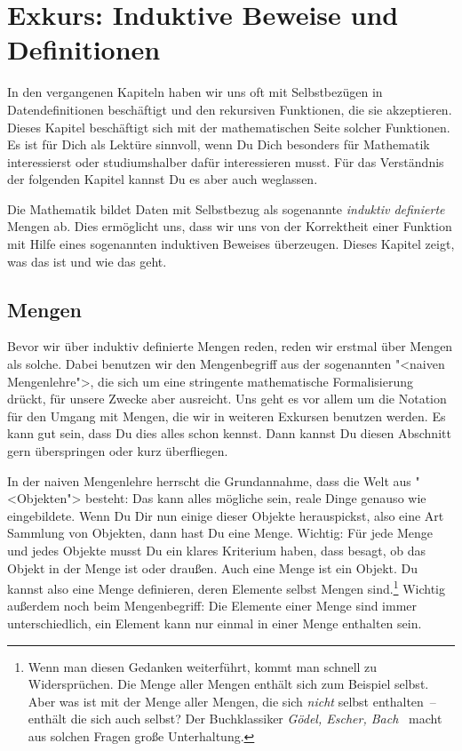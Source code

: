 
\chapter{Exkurs: Induktive Beweise und Definitionen}
\label{cha:indu}

In den vergangenen Kapiteln haben wir uns oft mit Selbstbezügen in
Datendefinitionen beschäftigt und den rekursiven Funktionen, die sie
akzeptieren.  Dieses Kapitel beschäftigt sich mit der mathematischen
Seite solcher Funktionen.  Es ist für Dich als Lektüre sinnvoll, wenn
Du Dich besonders für Mathematik interessierst oder studiumshalber
dafür interessieren musst.  Für das Verständnis der folgenden Kapitel
kannst Du es aber auch weglassen.

Die Mathematik bildet Daten mit Selbstbezug als sogenannte
\textit{induktiv definierte} Mengen ab.  Dies ermöglicht uns, dass wir
uns von der Korrektheit einer Funktion mit Hilfe eines sogenannten
induktiven Beweises überzeugen.  Dieses Kapitel zeigt, was das ist und
wie das geht.

\section{Mengen}
\label{sec:mengen}

Bevor wir über induktiv definierte Mengen reden, reden wir erstmal
über Mengen als solche.  Dabei benutzen wir den
Mengenbegriff aus der sogenannten "<naiven Mengenlehre">, die sich um
eine stringente mathematische Formalisierung drückt, für unsere Zwecke
aber ausreicht.  Uns geht es vor allem um die Notation für den Umgang
mit Mengen, die wir in weiteren Exkursen benutzen werden.  Es kann gut
sein, dass Du dies alles schon kennst.  Dann kannst Du diesen
Abschnitt gern überspringen oder kurz überfliegen.

In der naiven Mengenlehre herrscht die Grundannahme, dass die Welt aus
"<Objekten"> besteht: Das kann alles mögliche sein, reale Dinge genauso
wie eingebildete.  Wenn Du Dir nun einige dieser
Objekte herauspickst, also eine Art Sammlung von Objekten, dann hast
Du eine Menge.  Wichtig: Für jede Menge und jedes Objekte musst Du ein
klares Kriterium haben, dass besagt, ob das Objekt in der Menge ist
oder draußen.  Auch eine Menge ist ein Objekt.  Du kannst also eine
Menge definieren, deren Elemente selbst Mengen sind.\footnote{Wenn man
  diesen Gedanken weiterführt, kommt man schnell zu Widersprüchen.
  Die Menge aller Mengen enthält sich zum Beispiel selbst.  Aber was
  ist mit der Menge aller Mengen, die sich \emph{nicht} selbst
  enthalten~-- enthält die sich auch selbst?  Der Buchklassiker
  \textit{Gödel, Escher, Bach}~\cite{Hofstadter1979} macht aus solchen
  Fragen große Unterhaltung.}  Wichtig außerdem noch beim
Mengenbegriff: Die Elemente einer Menge sind immer unterschiedlich,
ein Element kann nur einmal in einer Menge enthalten sein.

